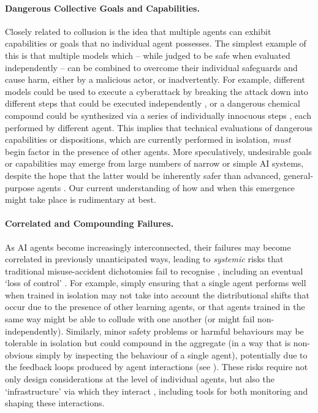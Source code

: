 \paragraph{Dangerous Collective Goals and Capabilities.}
Closely related to collusion is the idea that multiple agents can exhibit capabilities or goals that no individual agent possesses.
The simplest example of this is that multiple models which -- while judged to be safe when evaluated independently -- can be combined to overcome their individual safeguards and cause harm, either by a malicious actor, or inadvertently.
For example, different models could be used to execute a cyberattack by breaking the attack down into different steps that could be executed independently \citep{Jones2024}, or a dangerous chemical compound could be synthesized via a series of individually innocuous steps \citep{boiko_emergent_2023,urbina_dual_2022,Luo2024}, each performed by different agent.
This implies that technical evaluations of dangerous capabilities or dispositions, which are currently performed in isolation, \textit{must} begin factor in the presence of other agents.
More speculatively, undesirable goals or capabilities may emerge from large numbers of narrow or simple AI systems, despite the hope that the latter would be inherently safer than advanced, general-purpose agents \citep{Drexler2019,Chan2023-aj}.
Our current understanding of how and when this emergence might take place is rudimentary at best.


\paragraph{Correlated and Compounding Failures.}
As AI agents become increasingly interconnected, their failures may become correlated in previously unanticipated ways, leading to \textit{systemic} risks that traditional misuse-accident dichotomies fail to recognise \citep{Zweetsloot2019,Maas2018,Kasirzadeh2024}, including an eventual `loss of control' \citep{Kulveit2025,Russell2019,critch2023tasra}.
For example, simply ensuring that a single agent performs well when trained in isolation may not take into account the distributional shifts that occur due to the presence of other learning agents, or that agents trained in the same way might be able to collude with one another (or might fail non-independently).
Similarly, minor safety problems or harmful behaviours may be tolerable in isolation but could compound in the aggregate (in a way that is non-obvious simply by inspecting the behaviour of a single agent), potentially due to the feedback loops produced by agent interactions (see ).
These risks require not only design considerations at the level of individual agents, but also the `infrastructure' via which they interact \citep{Chan2025}, including tools for both monitoring and shaping these interactions.

